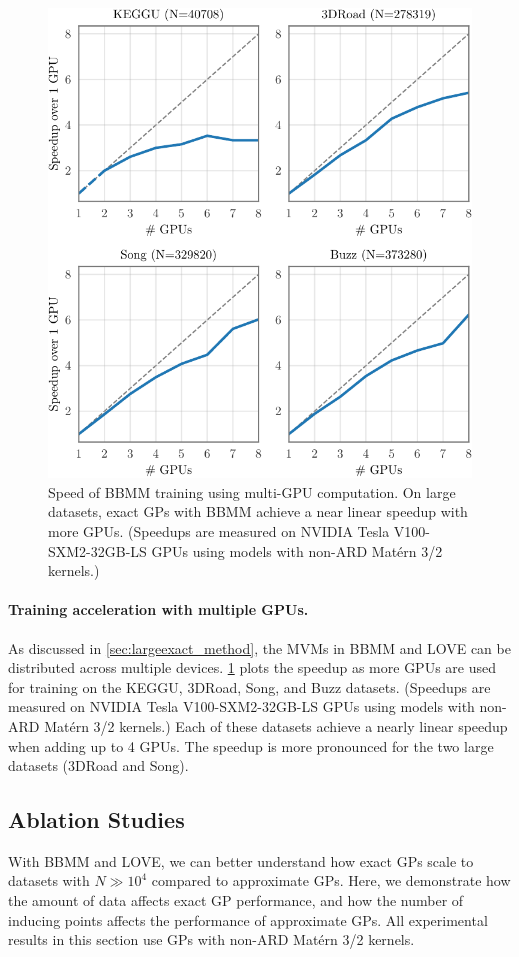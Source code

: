 \begin{figure}[t!]
  \centering
  \includegraphics[width=0.70\linewidth]{figures/gpu_speedup.pdf}
  \caption[Speed of BBMM training using multi-GPU computation.]{
    Speed of BBMM training using multi-GPU computation.
    On large datasets, exact GPs with BBMM achieve a near linear speedup with more GPUs.
    (Speedups are measured on NVIDIA Tesla V100-SXM2-32GB-LS GPUs using models with non-ARD Mat\'ern 3/2 kernels.)
  }
  \label{fig:gpu_speedup}
\end{figure}

\paragraph{Training acceleration with multiple GPUs.}
As discussed in \cref{sec:largeexact_method}, the MVMs in BBMM and LOVE can be distributed across multiple devices.
\cref{fig:gpu_speedup} plots the speedup as more GPUs are used for training on the KEGGU, 3DRoad, Song, and Buzz datasets.
(Speedups are measured on NVIDIA Tesla V100-SXM2-32GB-LS GPUs using models with non-ARD Mat\'ern 3/2 kernels.)
Each of these datasets achieve a nearly linear speedup when adding up to 4 GPUs.
The speedup is more pronounced for the two large datasets (3DRoad and Song).


\subsection{Ablation Studies}
With BBMM and LOVE, we can better understand how exact GPs scale to datasets with $N\gg 10^4$ compared to approximate GPs.
Here, we demonstrate how the amount of data affects exact GP performance, and how the number of inducing points affects the performance of approximate GPs.
All experimental results in this section use GPs with non-ARD Mat\'ern 3/2 kernels.

